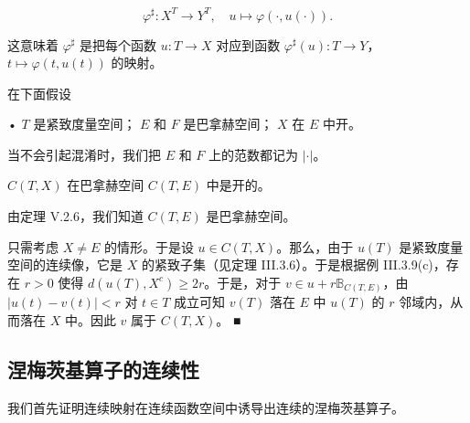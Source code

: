\[
\varphi^{\sharp} : X^{T} \to Y^{T} , \quad u \mapsto \varphi(\cdot, u(\cdot)) .
\]

这意味着 $ \varphi^{\sharp} $ 是把每个函数 $ u : T \to X $ 对应到函数 $ \varphi^{\sharp}(u) : T \to Y $，$ t \mapsto \varphi(t, u(t)) $ 的映射。

在下面假设

• $ T $ 是紧致度量空间；
  $ E $ 和 $ F $ 是巴拿赫空间；
  $ X $ 在 $ E $ 中开。

当不会引起混淆时，我们把 $ E $ 和 $ F $ 上的范数都记为 $ \left|\cdot\right| $。

\begin{lemma}

$ C(T, X) $ 在巴拿赫空间 $ C(T, E) $ 中是开的。

\proofhead
由定理 V.2.6，我们知道 $ C(T, E) $ 是巴拿赫空间。

只需考虑 $ X \ne E $ 的情形。于是设 $ u \in C(T, X) $。那么，由于 $ u(T) $ 是紧致度量空间的连续像，它是 $ X $ 的紧致子集（见定理 III.3.6）。于是根据例 III.3.9(c)，存在 $ r > 0 $ 使得 $ d(u(T), X^{c}) \ge 2r $。于是，对于 $ v \in u + r\mathbb{B}_{C(T,E)} $，由 $ |u(t) - v(t)| < r $ 对 $ t \in T $ 成立可知 $ v(T) $ 落在 $ E $ 中 $ u(T) $ 的 $ r $ 邻域内，从而落在 $ X $ 中。因此 $ v $ 属于 $ C(T, X) $。 \nobreak\hspace{0.35em}■
\end{lemma}

\subsection*{涅梅茨基算子的连续性}

我们首先证明连续映射在连续函数空间中诱导出连续的涅梅茨基算子。

